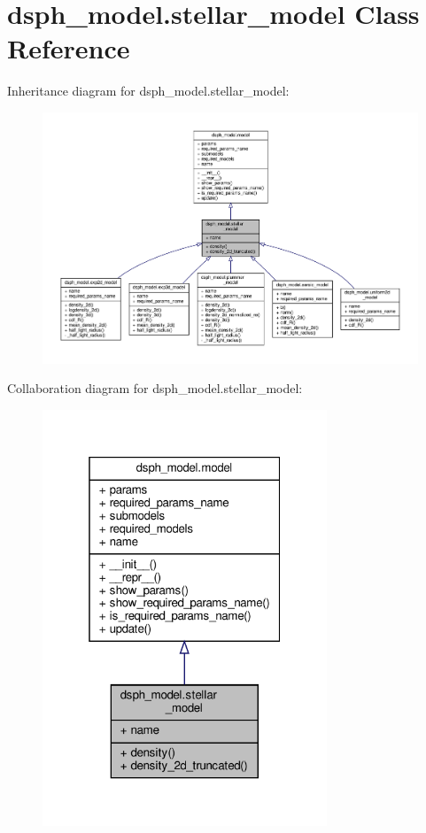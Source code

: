 \hypertarget{classdsph__model_1_1stellar__model}{}\section{dsph\+\_\+model.\+stellar\+\_\+model Class Reference}
\label{classdsph__model_1_1stellar__model}


Inheritance diagram for dsph\+\_\+model.\+stellar\+\_\+model\+:\nopagebreak
\begin{figure}[H]
\begin{center}
\leavevmode
\includegraphics[width=350pt]{dd/d98/classdsph__model_1_1stellar__model__inherit__graph}
\end{center}
\end{figure}


Collaboration diagram for dsph\+\_\+model.\+stellar\+\_\+model\+:\nopagebreak
\begin{figure}[H]
\begin{center}
\leavevmode
\includegraphics[width=241pt]{d0/df8/classdsph__model_1_1stellar__model__coll__graph}
\end{center}
\end{figure}
